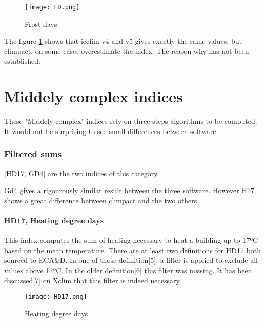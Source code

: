 \documentclass[a4paper,11pt]{article}
\begin{document}
    \begin{figure}[!hbt]
        \centering
        \texttt{[image: FD.png]}
        \caption{Frost days}
        \label{figure/fd}
    \end{figure}
    
    The figure \ref{figure/fd} shows that icclim v4 and v5 gives exactly the same values, but climpact, on some cases overestimate the index.
    The reason why has not been established.
    
\part{Middely complex indices}
    These "Middely complex" indices rely on three steps algorithms
    to be computed.
    It would not be surprising to see small differences between software.

\section{Filtered sums}
    [HD17, GD4] are the two indices of this category.

    Gd4 gives a rigourously similar result between the three software.
    However H17 shows a great difference between climpact and the two others.

\subsection{HD17, Heating degree days}
    This index computes the sum of heating necessary to heat a building up to 17ºC based on the mean temperature.
    There are at least two definitions for HD17 both sourced to ECA\&D.
    In one of those definition[5], a filter is applied to exclude all values above 17ºC. In the older definition[6] this filter was missing.
    It has been discussed[7] on Xclim that this filter is indeed necessary.

    \begin{figure}[!hbt]
        \centering
        \texttt{[image: HD17.png]}
        \caption{Heating degree days}
        \label{figure/hd17}
    \end{figure}
\end{document}
